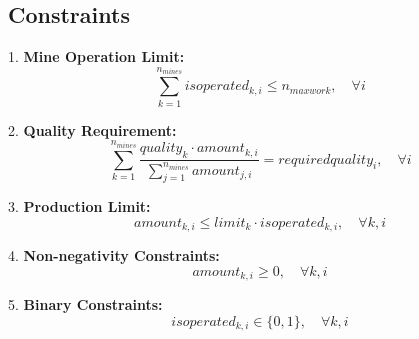 \documentclass{article}
\begin{document}
\subsection*{Constraints}
1. \textbf{Mine Operation Limit:}
\[
\sum_{k=1}^{n_{mines}} isoperated_{k,i} \leq n_{maxwork}, \quad \forall i
\]

2. \textbf{Quality Requirement:}
\[
\sum_{k=1}^{n_{mines}} \frac{quality_k \cdot amount_{k,i}}{\sum_{j=1}^{n_{mines}} amount_{j,i}} = requiredquality_i, \quad \forall i
\]

3. \textbf{Production Limit:}
\[
amount_{k,i} \leq limit_k \cdot isoperated_{k,i}, \quad \forall k, i
\]

4. \textbf{Non-negativity Constraints:}
\[
amount_{k,i} \geq 0, \quad \forall k, i
\]

5. \textbf{Binary Constraints:}
\[
isoperated_{k,i} \in \{0, 1\}, \quad \forall k, i
\]
\end{document}
